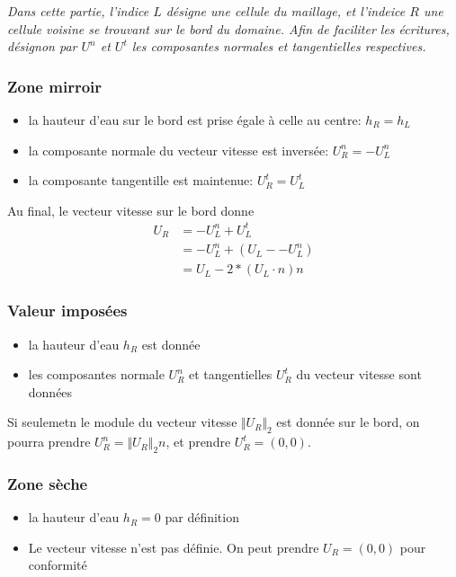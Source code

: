 \documentclass[
	french,
	11pt, %
]{fphw}
\begin{document}
\textit{Dans cette partie, l'indice $L$ désigne une cellule du maillage, et l'indeice $R$ une cellule voisine se trouvant sur le bord du domaine. Afin de faciliter les écritures, désignon par $U^n$ et $U^t$ les composantes normales et tangentielles respectives.}

\subsubsection*{Zone mirroir}
\begin{itemize}
	\item la hauteur d'eau sur le bord est prise égale à celle au centre: $h_R = h_L$
	\item la composante normale du vecteur vitesse est inversée: $U_R^n = -U_L^n$ 
	\item la composante tangentille est maintenue: $U_R^t = U_L^t$
\end{itemize}
Au final, le vecteur vitesse sur le bord donne
\begin{align*}
	U_R &= -U^n_L + U^t_L \\
	&= -U^n_L + (U_L - -U^n_L) \\
	&= U_L - 2*(U_L \cdot n)n 
\end{align*}  

\subsubsection*{Valeur imposées}
\begin{itemize}
	\item la hauteur d'eau $h_R$ est donnée
	\item les composantes normale $U_R^n$ et tangentielles $U_R^t$ du vecteur vitesse sont données 
\end{itemize}
Si seulemetn le module du vecteur vitesse $\Vert U_R \Vert_2$ est donnée sur le bord, on pourra prendre $U_R^n = \Vert U_R \Vert_2 n$, et prendre $U_R^t = (0,0)$.

\subsubsection*{Zone sèche}
\begin{itemize}
	\item la hauteur d'eau $h_R = 0$ par définition
	\item Le vecteur vitesse n'est pas définie. On peut prendre $U_R = (0,0)$ pour conformité
\end{itemize}
\end{document}
